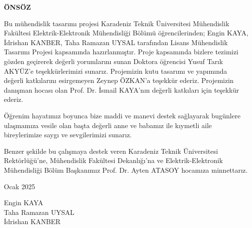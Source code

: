{\centering \textbf{ÖNSÖZ}\par}

{
\setlength{\parindent}{0pt}
Bu mühendislik tasarımı projesi Karadeniz Teknik Üniversitesi Mühendislik Fakültesi Elektrik-Elektronik Mühendisliği Bölümü öğrencilerinden; Engin KAYA, İdrishan KANBER, Taha Ramazan UYSAL tarafından Lisans Mühendislik Tasarımı Projesi kapsamında hazırlanmıştır. Proje kapsamında bizlere tezimizi gözden geçirerek değerli yorumlarını sunan Doktora öğrencisi Yusuf Tarık AKYÜZ’e teşekkürlerimizi sunarız. Projemizin kutu tasarımı ve yapımında değerli katkılarını esirgemeyen Zeynep ÖZKAN'a teşekkür ederiz. Projemizin danışman hocası olan Prof. Dr. İsmail KAYA'nın değerli katkıları için teşekkür ederiz. 

Öğrenim hayatımız boyunca bize maddi ve manevi destek sağlayarak bugünlere ulaşmamıza vesile olan başta değerli anne ve babamız ile kıymetli aile bireylerimize saygı ve sevgilerimizi sunarız.

Benzer şekilde bu çalışmaya destek veren Karadeniz Teknik Üniversitesi
Rektörlüğü'ne, Mühendislik Fakültesi Dekanlığı'na ve Elektrik-Elektronik Mühendisliği Bölüm Başkanımız Prof. Dr. Ayten ATASOY hocamıza minnettarız.

\vspace{3cm}


\begin{flushleft}
    Ocak 2025

    Engin KAYA \\
    Taha Ramazan UYSAL \\
    İdrishan KANBER
\end{flushleft}

}


{}
